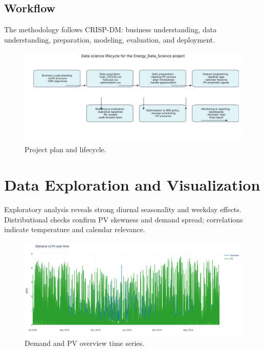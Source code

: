 \documentclass[12pt,a4paper]{article}
\begin{document}
\subsection{Workflow}
The methodology follows CRISP-DM: business understanding, data understanding, preparation, modeling, evaluation, and deployment.

\begin{figure}[H]
  \centering
  \includegraphics[width=\linewidth]{task2_lifecycle.png}
  \caption{Project plan and lifecycle.}
  \label{fig:lifecycle}
\end{figure}

\section{Data Exploration and Visualization}
Exploratory analysis reveals strong diurnal seasonality and weekday effects. Distributional checks confirm PV skewness and demand spread; correlations indicate temperature and calendar relevance.

\begin{figure}[H]
  \centering
  \includegraphics[width=\linewidth]{01_demand_pv_timeseries.png}
  \caption{Demand and PV overview time series.}
  \label{fig:timeseries_main}
\end{figure}
\end{document}

